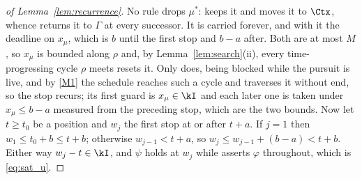 \begin{proof}[of Lemma~\ref{lem:recurrence}]
No rule drops $\mu^{\ast}$:  keeps it and  moves it to $\Ctx$, whence
 returns it to $\Gamma$ at every successor. It is carried forever, and with it the
deadline on $x_\mu$, which is $b$ until the first stop and $b-a$ after. Both are at most $M$, so
$x_\mu$ is bounded along $\rho$ and, by Lemma~\ref{lem:search}(ii), every time-progressing cycle
$\rho$ meets resets it. Only  does,  being blocked while the pursuit
is live, and by \ref{M1} the schedule reaches such a cycle and traverses it without end, so the stop
recurs; its first guard is $x_\mu\in\kI$ and each later one is taken under $x_\mu\le b-a$ measured
from the preceding stop, which are the two bounds. Now let $t\ge t_0$ be a position and
$w_j$ the first stop at or after $t+a$. If $j=1$ then $w_1\le t_0+b\le t+b$; otherwise $w_{j-1}<t+a$,
so $w_j\le w_{j-1}+(b-a)<t+b$. Either way $w_j-t\in\kI$, and $\psi$ holds at $w_j$ while
 asserts $\varphi$ throughout, which is \eqref{eq:sat_u}.
\end{proof}
\fi



